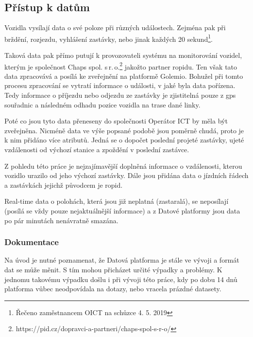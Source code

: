 \subsection{Přístup k datům}

Vozidla vysílají data o své poloze při různých událostech. Zejména pak při brždění, rozjezdu, vyhlášení zastávky, nebo jinak každých 20 sekund\footnote{Řečeno zaměstnancem OICT na schůzce 4. 5. 2019}.

\bigbreak

Taková data pak přímo putují k provozovateli systému na monitorování vozidel, kterým je společnost Chaps spol. s\,r.\,o.\footnote{https://pid.cz/dopravci-a-partneri/chaps-spol-s-r-o/} jakožto partner \gls{ropid}u. Ten však tato data zpracovává a posílá ke zveřejnění na platformě Golemio. Bohužel při tomto procesu zpracování se vytratí informace o události, v jaké byla data pořízena. Tedy informace o příjezdu nebo odjezdu ze zastávky je zjistitelná pouze z \gls{gps} souřadnic a následném odhadu pozice vozidla na trase dané linky.

\bigbreak

Poté co jsou tyto data přeneseny do společnosti Operátor ICT by měla být zveřejněna. Nicméně data ve výše popsané podobě jsou poměrně chudá, proto je k nim přidáno více atributů. Jedná se o dopočet poslední projeté zastávky, ujeté vzdálenosti od výchozí stanice a zpoždění v poslední zastávce.

\bigbreak

Z pohledu této práce je nejzajímavější doplněná informace o vzdálenosti, kterou vozidlo urazilo od jeho výchozí zastávky. Dále jsou přidána data o jízdních řádech a zastávkách jejichž původcem je \gls{ropid}.

\bigbreak

Real-time data o polohách, která jsou již neplatná (zastaralá), se neposílají (posílá se vždy pouze nejaktuálnější informace) a z Datové platformy jsou data po pár minutách nenávratně smazána.

\subsubsection{Dokumentace}

Na úvod je nutné poznamenat, že Datová platforma je stále ve vývoji a formát dat se může měnit. S tím mohou přicházet určité výpadky a problémy. K jednomu takovému výpadku došlu i při vývoji této práce, kdy po dobu 14 dnů platforma vůbec neodpovídala na dotazy, nebo vracela prázdné datasety.

